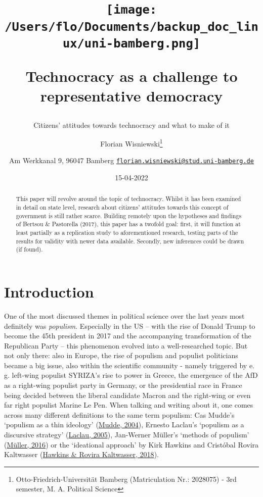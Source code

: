 \documentclass[
  12pt,
  english,
]{article}
\title{\texttt{[image: /Users/flo/Documents/backup\_doc\_linux/uni-bamberg.png]}

Technocracy as a challenge to representative democracy}
\subtitle{Citizens' attitudes towards technocracy and what to make of
it}
\author{Florian Wisniewski\footnote{Otto-Friedrich-Universität Bamberg
  (Matriculation Nr.: 2028075) - 3rd semester, M. A. Political Science} \and Am
Werkkanal 9, 96047 Bamberg \textbar{}
\href{mailto:florian.wisniewski@stud.uni-bamberg.de}{\nolinkurl{florian.wisniewski@stud.uni-bamberg.de}}}
\date{15-04-2022}
\begin{document}
\maketitle
\begin{abstract}
This paper will revolve around the topic of technocracy. Whilst it has
been examined in detail on state level, research about citizens'
attitudes towards this concept of government is still rather scarce.
Building remotely upon the hypotheses and findings of Bertsou \&
Pastorella (2017), this paper has a twofold goal: first, it will
function at least partially as a replication study to aforementioned
research, testing parts of the results for validity with newer data
available. Secondly, new inferences could be drawn (if found).
\end{abstract}

\newpage{}

\tableofcontents

\newpage{}

\hypertarget{introduction}{%
\section{Introduction}\label{introduction}}

One of the most discussed themes in political science over the last
years most definitely was \emph{populism}. Especially in the US -- with
the rise of Donald Trump to become the 45th president in 2017 and the
accompanying transformation of the Republican Party -- this phenomenon
evolved into a well-researched topic. But not only there: also in
Europe, the rise of populism and populist politicians became a big
issue, also within the scientific community - namely triggered by e. g.
left-wing populist SYRIZA's rise to power in Greece, the emergence of
the AfD as a right-wing populist party in Germany, or the presidential
race in France being decided between the liberal candidate Macron and
the right-wing or even far right populist Marine Le Pen. When talking
and writing about it, one comes across many different definitions to the
same term populism: Cas Mudde's `populism as a thin ideology'
(\protect\hyperlink{ref-mudde2004populist}{Mudde, 2004}), Ernesto
Laclau's `populism as a discursive strategy'
(\protect\hyperlink{ref-laclau2005populist}{Laclau, 2005}), Jan-Werner
Müller's `methods of populism'
(\protect\hyperlink{ref-muxfcller2016populismus}{Müller, 2016}) or the
`ideational approach' by Kirk Hawkins and Cristóbal Rovira Kaltwasser
(\protect\hyperlink{ref-hawkins2018ideational}{Hawkins \& Rovira
Kaltwasser, 2018}).
\end{document}
